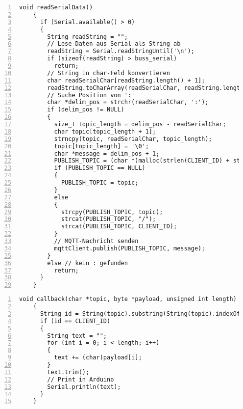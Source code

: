 \documentclass[12pt, letterpaper]{article}
\begin{document}
  \begin{lstlisting}[frame=single, style=cpp, numbers=left, label={lst:esp8266readserial}, caption={ESP8266: readSerialData}]
    void readSerialData()
    {
      if (Serial.available() > 0)
      {
        String readString = "";
        // Lese Daten aus Serial als String ab
        readString = Serial.readStringUntil('\n');
        if (sizeof(readString) > buss_serial)
          return;
        // String in char-Feld konvertieren
        char readSerialChar[readString.length() + 1];
        readString.toCharArray(readSerialChar, readString.length() + 1);    
        // Suche Position von ':'
        char *delim_pos = strchr(readSerialChar, ':');
        if (delim_pos != NULL)
        {
          size_t topic_length = delim_pos - readSerialChar;
          char topic[topic_length + 1];
          strncpy(topic, readSerialChar, topic_length);
          topic[topic_length] = '\0';
          char *message = delim_pos + 1;
          PUBLISH_TOPIC = (char *)malloc(strlen(CLIENT_ID) + strlen(topic) + 2);
          if (PUBLISH_TOPIC == NULL)
          {
            PUBLISH_TOPIC = topic;
          }
          else
          {
            strcpy(PUBLISH_TOPIC, topic);
            strcat(PUBLISH_TOPIC, "/");
            strcat(PUBLISH_TOPIC, CLIENT_ID);
          }
          // MQTT-Nachricht senden
          mqttClient.publish(PUBLISH_TOPIC, message);
        }
        else // kein : gefunden
          return;
      }
    }
  \end{lstlisting}

  \begin{lstlisting}[frame=single, style=cpp, numbers=left, label={lst:esp8266callback}, caption={ESP8266: callback}]
    void callback(char *topic, byte *payload, unsigned int length)
    {
      String id = String(topic).substring(String(topic).indexOf('/') + 1);
      if (id == CLIENT_ID)
      {
        String text = "";
        for (int i = 0; i < length; i++)
        {
          text += (char)payload[i];
        }
        text.trim();
        // Print in Arduino
        Serial.println(text);
      }
    }
  \end{lstlisting}
  
\end{document}
